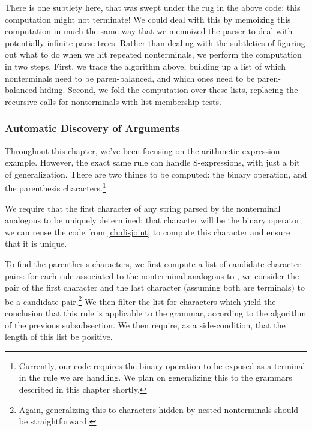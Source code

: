     There is one subtlety here, that was swept under the rug in the above code: this computation might not terminate!  We could deal with this by memoizing this computation in much the same way that we memoized the parser to deal with potentially infinite parse trees.  Rather than dealing with the subtleties of figuring out what to do when we hit repeated nonterminals, we perform the computation in two steps.  First, we trace the algorithm above, building up a list of which nonterminals need to be paren-balanced, and which ones need to be paren-balanced-hiding.  Second, we fold the computation over these lists, replacing the recursive calls for nonterminals with list membership tests. 
    
  \subsubsection{Automatic Discovery of Arguments}
    Throughout this chapter, we've been focusing on the arithmetic expression example.  However, the exact same rule can handle S-expressions, with just a bit of generalization.  There are two things to be computed: the binary operation, and the parenthesis characters.\footnote{Currently, our code requires the binary operation to be exposed as a terminal in the rule we are handling.  We plan on generalizing this to the grammars described in this chapter shortly.}
    
    We require that the first character of any string parsed by the nonterminal analogous to  be uniquely determined; that character will be the binary operator; we can reuse the code from \autoref{ch:disjoint} to compute this character and ensure that it is unique.
    
    To find the parenthesis characters, we first compute a list of candidate character pairs: for each rule associated to the nonterminal analogous to , we consider the pair of the first character and the last character (assuming both are terminals) to be a candidate pair.\footnote{Again, generalizing this to characters hidden by nested nonterminals should be straightforward.}  We then filter the list for characters which yield the conclusion that this rule is applicable to the grammar, according to the algorithm of the previous subsubsection.  We then require, as a side-condition, that the length of this list be positive.
    


